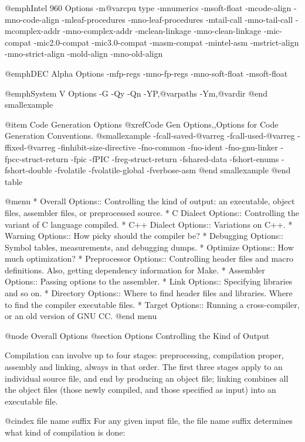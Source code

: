 @emph{Intel 960 Options}
-m@var{cpu type}
-mnumerics  -msoft-float
-mcode-align  -mno-code-align
-mleaf-procedures  -mno-leaf-procedures
-mtail-call  -mno-tail-call
-mcomplex-addr  -mno-complex-addr
-mclean-linkage  -mno-clean-linkage
-mic-compat  -mic2.0-compat  -mic3.0-compat
-masm-compat  -mintel-asm
-mstrict-align  -mno-strict-align
-mold-align  -mno-old-align

@emph{DEC Alpha Options}
-mfp-regs  -mno-fp-regs  -mno-soft-float
-msoft-float

@emph{System V Options}
-G  -Qy  -Qn  -YP,@var{paths}  -Ym,@var{dir}
@end smallexample

@item Code Generation Options
@xref{Code Gen Options,,Options for Code Generation Conventions}.
@smallexample
-fcall-saved-@var{reg}  -fcall-used-@var{reg} 
-ffixed-@var{reg}  -finhibit-size-directive 
-fno-common  -fno-ident
-fno-gnu-linker  -fpcc-struct-return  -fpic  -fPIC 
-freg-struct-return  -fshared-data  -fshort-enums
-fshort-double  -fvolatile  -fvolatile-global
-fverbose-asm
@end smallexample
@end table

@menu
* Overall Options::     Controlling the kind of output:
                        an executable, object files, assembler files,
                        or preprocessed source.
* C Dialect Options::   Controlling the variant of C language compiled.
* C++ Dialect Options:: Variations on C++.
* Warning Options::     How picky should the compiler be?
* Debugging Options::   Symbol tables, measurements, and debugging dumps.
* Optimize Options::    How much optimization?
* Preprocessor Options:: Controlling header files and macro definitions.
                         Also, getting dependency information for Make.
* Assembler Options::   Passing options to the assembler.
* Link Options::        Specifying libraries and so on.
* Directory Options::   Where to find header files and libraries.
                        Where to find the compiler executable files.
* Target Options::      Running a cross-compiler, or an old version of GNU CC.
@end menu

@node Overall Options
@section Options Controlling the Kind of Output

Compilation can involve up to four stages: preprocessing, compilation
proper, assembly and linking, always in that order.  The first three
stages apply to an individual source file, and end by producing an
object file; linking combines all the object files (those newly
compiled, and those specified as input) into an executable file.

@cindex file name suffix
For any given input file, the file name suffix determines what kind of
compilation is done:

